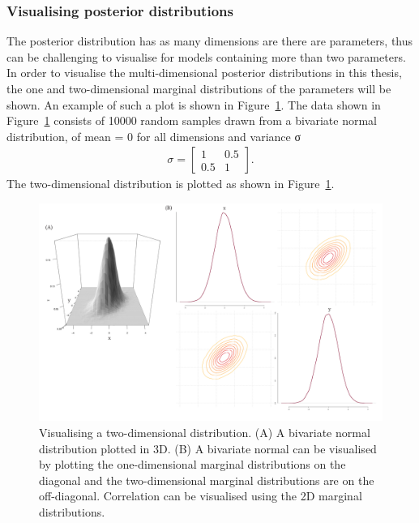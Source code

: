 \clearpage
\subsubsection{Visualising posterior distributions}

The posterior distribution has as many dimensions are there are parameters, thus can be challenging to visualise for models containing more than two parameters. In order to visualise the multi-dimensional posterior distributions in this thesis, the one and two-dimensional marginal distributions of the parameters will be shown. An example of such a plot is shown in Figure~\ref{fig:exampl_post}. The data shown in Figure~\ref{fig:exampl_post} consists of 10000 random samples drawn from a bivariate normal distribution, of mean = 0 for all dimensions and variance σ
\begin{align*}
σ = \begin{bmatrix}
1 &0.5 \\ 
 0.5& 1  
\end{bmatrix}.
\end{align*}
\noindent The two-dimensional distribution is plotted as shown in Figure~\ref{fig:exampl_post}.

\begin{figure}[h]
    \begin{center}
    \includegraphics[width=1.1\textwidth]{../../chapters/chapterBackgr/images/example_posterior.pdf}
    \caption[Example of a posterior distribution plot]{Visualising a two-dimensional distribution. (A) A bivariate normal distribution plotted in 3D. (B) A bivariate normal can be visualised by plotting the one-dimensional marginal distributions on the diagonal and the two-dimensional marginal distributions are on the off-diagonal. Correlation can be visualised using the 2D marginal distributions.}
    \label{fig:exampl_post}
    \end{center}
\end{figure}


